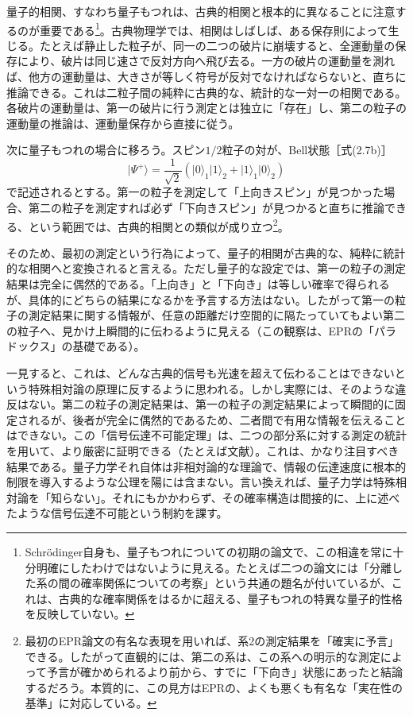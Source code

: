 量子的相関、すなわち量子もつれは、古典的相関と根本的に異なることに注意するのが重要である\footnote{Schrödinger自身も、量子もつれについての初期の論文で、この相違を常に十分明確にしたわけではないように見える。たとえば二つの論文には「分離した系の間の確率関係についての考察」という共通の題名が付いている\cite{ref052,ref053}が、これは、古典的な確率関係をはるかに超える、量子もつれの特異な量子的性格を反映していない。}。古典物理学では、相関はしばしば、ある保存則によって生じる。たとえば静止した粒子が、同一の二つの破片に崩壊すると、全運動量の保存により、破片は同じ速さで反対方向へ飛び去る。一方の破片の運動量を測れば、他方の運動量は、大きさが等しく符号が反対でなければならないと、直ちに推論できる。これは二粒子間の純粋に古典的な、統計的な一対一の相関である。各破片の運動量は、第一の破片に行う測定とは独立に「存在」し、第二の粒子の運動量の推論は、運動量保存から直接に従う。

次に量子もつれの場合に移ろう。スピン$1/2$粒子の対が、Bell状態［式(2.7b)］
\begin{equation}\lvert\Psi^+\rangle=\frac1{\sqrt2}(\lvert0\rangle_1\lvert1\rangle_2+\lvert1\rangle_1\lvert0\rangle_2)\tag{2.8}\end{equation}
で記述されるとする。第一の粒子を測定して「上向きスピン」が見つかった場合、第二の粒子を測定すれば必ず「下向きスピン」が見つかると直ちに推論できる、という範囲では、古典的相関との類似が成り立つ\footnote{最初のEPR論文\cite{ref010}の有名な表現を用いれば、系2の測定結果を「確実に予言」できる。したがって直観的には、第二の系は、この系への明示的な測定によって予言が確かめられるより前から、すでに「下向き」状態にあったと結論するだろう。本質的に、この見方はEPRの、よくも悪くも有名な「実在性の基準」に対応している。}。

\hypertarget{srcpage:31}{}\label{srcpage:31}
そのため、最初の測定という行為によって、量子的相関が古典的な、純粋に統計的な相関へと変換されると言える。ただし量子的な設定では、第一の粒子の測定結果は完全に偶然的である。「上向き」と「下向き」は等しい確率で得られるが、具体的にどちらの結果になるかを予言する方法はない。したがって第一の粒子の測定結果に関する情報が、任意の距離だけ空間的に隔たっていてもよい第二の粒子へ、見かけ上瞬間的に伝わるように見える（この観察は、EPRの「パラドックス」\cite{ref010}の基礎である）。

一見すると、これは、どんな古典的信号も光速を超えて伝わることはできないという特殊相対論の原理に反するように思われる。しかし実際には、そのような違反はない。第二の粒子の測定結果は、第一の粒子の測定結果によって瞬間的に固定されるが、後者が完全に偶然的であるため、二者間で有用な情報を伝えることはできない。この「信号伝達不可能定理」は、二つの部分系に対する測定の統計を用いて、より厳密に証明できる（たとえば文献\cite{ref056}）。これは、かなり注目すべき結果である。量子力学それ自体は非相対論的な理論で、情報の伝達速度に根本的制限を導入するような公理を陽には含まない。言い換えれば、量子力学は特殊相対論を「知らない」。それにもかかわらず、その確率構造は間接的に、上に述べたような信号伝達不可能という制約を課す。

